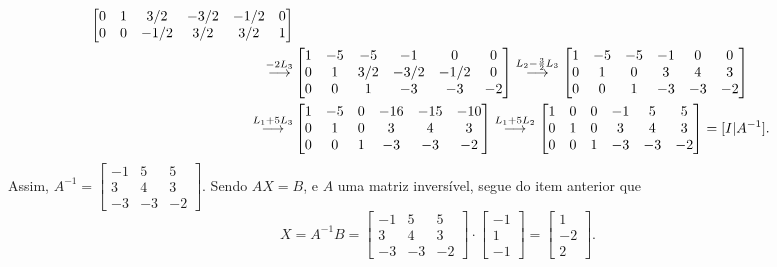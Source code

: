 \documentclass[12pt,a4paper]{article}
\newcommand{\grstep}[2][\relax]{%
   \ensuremath{\mathrel{
       {\mathop{\longrightarrow}\limits^{#2\mathstrut}_{
                                     \begin{subarray}{l} #1 \end{subarray}}}}}}
\begin{document}
\begin{ExerciseList}
\begin{align*}
\begin{bmatrix}
0 &  1 & 3/2 & -3/2 & -1/2 & 0 \\
0 &  0 & -1/2 & 3/2 & 3/2 & 1
\end{bmatrix}\\
\grstep{ -2 L_3}
& \begin{bmatrix}
1 & -5 & -5 & -1 & 0 & 0 \\
0 &  1 & 3/2 & -3/2 & -1/2 & 0 \\
0 &  0 &  1 & -3 & -3 & -2
\end{bmatrix}
\grstep{ L_2 - \frac{3}{2} L_3 }
\begin{bmatrix}
1 & -5 & -5 & -1 & 0 & 0 \\
0 &  1 &  0 &  3 & 4 & 3 \\
0 &  0 &  1 & -3 & -3 & -2
\end{bmatrix}\\
\grstep{ L_1 + 5 L_3 }
& \begin{bmatrix}
1 & -5 & 0 & -16 & -15 & -10 \\
0 & 1 & 0 &  3 & 4 & 3 \\
0 & 0 & 1 & -3 & -3 & -2
\end{bmatrix}
\grstep{ L_1 + 5 L_2 }
\begin{bmatrix}
1 & 0 & 0 & -1 &  5 &  5 \\
0 & 1 & 0 &  3 &  4 &  3 \\
0 & 0 & 1 & -3 & -3 & -2
\end{bmatrix}
=[I|A^{-1}].
\end{align*}
Assim, $A^{-1}=
\begin{bmatrix}
-1 &  5 & 5 \\
 3 &  4 & 3 \\
-3 & -3 & -2
\end{bmatrix}$. Sendo $AX = B$, e $A$ uma matriz inversível, segue do item anterior que
\[
X = A^{-1}B =
\begin{bmatrix}
-1 &  5 & 5 \\
 3 &  4 & 3 \\
-3 & -3 & -2
\end{bmatrix}
\cdot
\begin{bmatrix}-1\\1\\-1\end{bmatrix}
=\begin{bmatrix}1\\-2\\2\end{bmatrix}.
\]



\end{ExerciseList}
\end{document}
